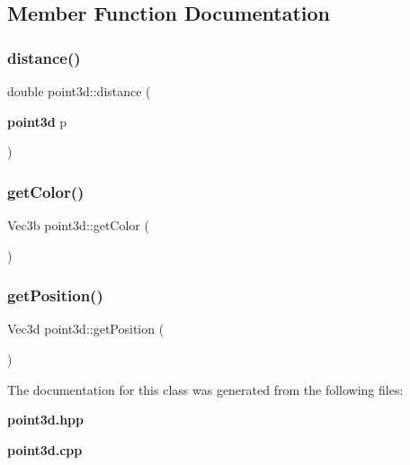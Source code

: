 \subsection{Member Function Documentation}
\mbox{\label{classpoint3d_a7872f374cd41ad4a4f63786f605a10a5}} 
\subsubsection{distance()}
{\footnotesize\ttfamily double point3d\+::distance (\begin{DoxyParamCaption}\item[{\textbf{ point3d}}]{p }\end{DoxyParamCaption})}

\mbox{\label{classpoint3d_a133b9989d89645695b71c71a3f67e014}} 
\subsubsection{get\+Color()}
{\footnotesize\ttfamily Vec3b point3d\+::get\+Color (\begin{DoxyParamCaption}{ }\end{DoxyParamCaption})}

\mbox{\label{classpoint3d_abde5a74021350422e880806284eb4b73}} 
\subsubsection{get\+Position()}
{\footnotesize\ttfamily Vec3d point3d\+::get\+Position (\begin{DoxyParamCaption}{ }\end{DoxyParamCaption})}



The documentation for this class was generated from the following files\+:\begin{DoxyCompactItemize}
\item 
\textbf{ point3d.\+hpp}\item 
\textbf{ point3d.\+cpp}\end{DoxyCompactItemize}
